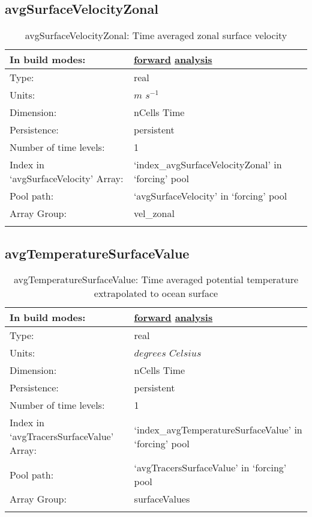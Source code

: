 \subsection[avgSurfaceVelocityZonal]{avgSurfaceVelocityZonal}
\label{subsec:var_sec_forcing_avgSurfaceVelocityZonal}
\begin{center}
\begin{longtable}{| p{2.0in} | p{4.0in} |}
        \hline 
        In build modes: & \hyperref[subsec:forward_var_tab_forcing]{forward} \hyperref[subsec:analysis_var_tab_forcing]{analysis} \\
        \hline 
        Type: & real \\
        \hline 
        Units: & $m$ $s^{-1}$ \\
        \hline 
        Dimension: & nCells Time \\
        \hline 
        Persistence: & persistent \\
        \hline 
        Number of time levels: & 1 \\
        \hline 
		 Index in `avgSurfaceVelocity' Array: & `index\_avgSurfaceVelocityZonal' in `forcing' pool \\
		 \hline 
            Pool path: & `avgSurfaceVelocity' in `forcing' pool \\
		 \hline 
		 Array Group: & vel\_zonal \\
		 \hline 
    \caption{avgSurfaceVelocityZonal: Time averaged zonal surface velocity}
\end{longtable}
\end{center}
\subsection[avgTemperatureSurfaceValue]{avgTemperatureSurfaceValue}
\label{subsec:var_sec_forcing_avgTemperatureSurfaceValue}
\begin{center}
\begin{longtable}{| p{2.0in} | p{4.0in} |}
        \hline 
        In build modes: & \hyperref[subsec:forward_var_tab_forcing]{forward} \hyperref[subsec:analysis_var_tab_forcing]{analysis} \\
        \hline 
        Type: & real \\
        \hline 
        Units: & $degrees$ $Celsius$ \\
        \hline 
        Dimension: & nCells Time \\
        \hline 
        Persistence: & persistent \\
        \hline 
        Number of time levels: & 1 \\
        \hline 
		 Index in `avgTracersSurfaceValue' Array: & `index\_avgTemperatureSurfaceValue' in `forcing' pool \\
		 \hline 
            Pool path: & `avgTracersSurfaceValue' in `forcing' pool \\
		 \hline 
		 Array Group: & surfaceValues \\
		 \hline 
    \caption{avgTemperatureSurfaceValue: Time averaged potential temperature extrapolated to ocean surface}
\end{longtable}
\end{center}
